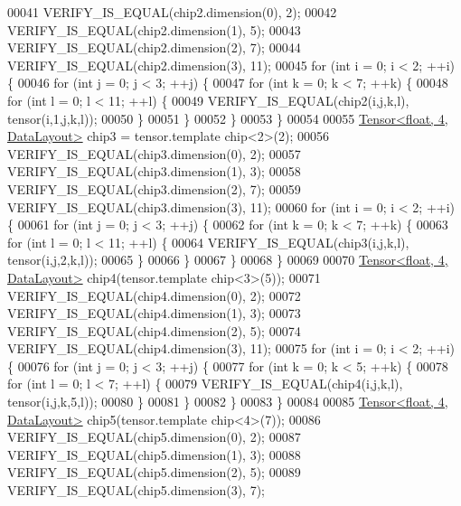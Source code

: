 \begin{DoxyCode}
00041   VERIFY\_IS\_EQUAL(chip2.dimension(0), 2);
00042   VERIFY\_IS\_EQUAL(chip2.dimension(1), 5);
00043   VERIFY\_IS\_EQUAL(chip2.dimension(2), 7);
00044   VERIFY\_IS\_EQUAL(chip2.dimension(3), 11);
00045   \textcolor{keywordflow}{for} (\textcolor{keywordtype}{int} i = 0; i < 2; ++i) \{
00046     \textcolor{keywordflow}{for} (\textcolor{keywordtype}{int} j = 0; j < 3; ++j) \{
00047       \textcolor{keywordflow}{for} (\textcolor{keywordtype}{int} k = 0; k < 7; ++k) \{
00048         \textcolor{keywordflow}{for} (\textcolor{keywordtype}{int} l = 0; l < 11; ++l) \{
00049           VERIFY\_IS\_EQUAL(chip2(i,j,k,l), tensor(i,1,j,k,l));
00050         \}
00051       \}
00052     \}
00053   \}
00054 
00055   \hyperlink{class_eigen_1_1_tensor}{Tensor<float, 4, DataLayout>} chip3 = tensor.template chip<2>(2);
00056   VERIFY\_IS\_EQUAL(chip3.dimension(0), 2);
00057   VERIFY\_IS\_EQUAL(chip3.dimension(1), 3);
00058   VERIFY\_IS\_EQUAL(chip3.dimension(2), 7);
00059   VERIFY\_IS\_EQUAL(chip3.dimension(3), 11);
00060   \textcolor{keywordflow}{for} (\textcolor{keywordtype}{int} i = 0; i < 2; ++i) \{
00061     \textcolor{keywordflow}{for} (\textcolor{keywordtype}{int} j = 0; j < 3; ++j) \{
00062       \textcolor{keywordflow}{for} (\textcolor{keywordtype}{int} k = 0; k < 7; ++k) \{
00063         \textcolor{keywordflow}{for} (\textcolor{keywordtype}{int} l = 0; l < 11; ++l) \{
00064           VERIFY\_IS\_EQUAL(chip3(i,j,k,l), tensor(i,j,2,k,l));
00065         \}
00066       \}
00067     \}
00068   \}
00069 
00070   \hyperlink{class_eigen_1_1_tensor}{Tensor<float, 4, DataLayout>} chip4(tensor.template chip<3>(5));
00071   VERIFY\_IS\_EQUAL(chip4.dimension(0), 2);
00072   VERIFY\_IS\_EQUAL(chip4.dimension(1), 3);
00073   VERIFY\_IS\_EQUAL(chip4.dimension(2), 5);
00074   VERIFY\_IS\_EQUAL(chip4.dimension(3), 11);
00075   \textcolor{keywordflow}{for} (\textcolor{keywordtype}{int} i = 0; i < 2; ++i) \{
00076     \textcolor{keywordflow}{for} (\textcolor{keywordtype}{int} j = 0; j < 3; ++j) \{
00077       \textcolor{keywordflow}{for} (\textcolor{keywordtype}{int} k = 0; k < 5; ++k) \{
00078         \textcolor{keywordflow}{for} (\textcolor{keywordtype}{int} l = 0; l < 7; ++l) \{
00079           VERIFY\_IS\_EQUAL(chip4(i,j,k,l), tensor(i,j,k,5,l));
00080         \}
00081       \}
00082     \}
00083   \}
00084 
00085   \hyperlink{class_eigen_1_1_tensor}{Tensor<float, 4, DataLayout>} chip5(tensor.template chip<4>(7));
00086   VERIFY\_IS\_EQUAL(chip5.dimension(0), 2);
00087   VERIFY\_IS\_EQUAL(chip5.dimension(1), 3);
00088   VERIFY\_IS\_EQUAL(chip5.dimension(2), 5);
00089   VERIFY\_IS\_EQUAL(chip5.dimension(3), 7);

\end{DoxyCode}
